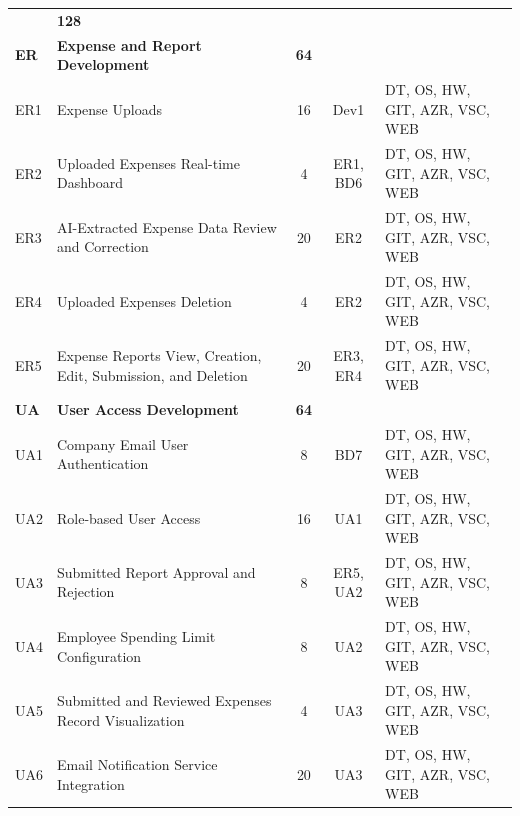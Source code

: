 \begin{longtable}{l p{6.5cm} c c p{5cm}}
    \rowcolor{gray!20}
    \multicolumn{2}{l}{\textbf{Frontend and Backend Development}} & \textbf{128} & & \\ 

    \rowcolor{gray!10}
    \textbf{ER} & \textbf{Expense and Report Development} & \textbf{64} & & \\ 
    \rowcolor{gray!05}
    ER1 & Expense Uploads & 16 & Dev1 & DT, OS, HW, GIT, AZR, VSC, WEB \\ 
    \rowcolor{gray!05}
    ER2 & Uploaded Expenses Real-time Dashboard & 4 & ER1, BD6 & DT, OS, HW, GIT, AZR, VSC, WEB \\ 
    \rowcolor{gray!05}
    ER3 & AI-Extracted Expense Data Review and Correction & 20 & ER2 & DT, OS, HW, GIT, AZR, VSC, WEB \\ 
    \rowcolor{gray!05}
    ER4 & Uploaded Expenses Deletion & 4 & ER2 & DT, OS, HW, GIT, AZR, VSC, WEB \\ 
    \rowcolor{gray!05}
    ER5 & Expense Reports View, Creation, Edit, Submission, and Deletion & 20 & ER3, ER4 & DT, OS, HW, GIT, AZR, VSC, WEB \\

    \rowcolor{gray!10}
    \textbf{UA} & \textbf{User Access Development} & \textbf{64} & & \\  
    \rowcolor{gray!05}
    UA1 & Company Email User Authentication & 8 & BD7 & DT, OS, HW, GIT, AZR, VSC, WEB \\
    \rowcolor{gray!05}  
    UA2 & Role-based User Access & 16 & UA1 & DT, OS, HW, GIT, AZR, VSC, WEB \\ 
    \rowcolor{gray!05}
    UA3 & Submitted Report Approval and Rejection & 8 & ER5, UA2 & DT, OS, HW, GIT, AZR, VSC, WEB \\ 
    \rowcolor{gray!05}
    UA4 & Employee Spending Limit Configuration & 8 & UA2 & DT, OS, HW, GIT, AZR, VSC, WEB \\ 
    \rowcolor{gray!05}
    UA5 & Submitted and Reviewed Expenses Record Visualization & 4 & UA3 & DT, OS, HW, GIT, AZR, VSC, WEB \\ 
    \rowcolor{gray!05}
    UA6 & Email Notification Service Integration & 20 & UA3 & DT, OS, HW, GIT, AZR, VSC, WEB \\ 


\end{longtable}

